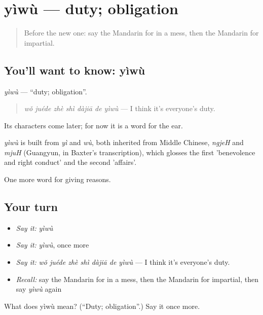 \section[yìwù]{yìwù — duty; obligation}

\label{lesson:ZH-C362-yiwu}



\begin{quote}
Before the new one: say the Mandarin for in a mess, then the Mandarin for impartial.
\end{quote}

\subsection*{You'll want to know: yìwù}
\emph{yìwù} — \textquotedblleft{}duty; obligation\textquotedblright{}.

\begin{quote}
\emph{wǒ juéde zhè shì dàjiā de yìwù} — I think it's everyone's duty.
\end{quote}

Its characters come later; for now it is a word for the ear.

\begin{cousinweb}
\emph{yìwù} is built from \emph{yì} and \emph{wù}, both inherited from Middle Chinese, \emph{ngjeH} and \emph{mjuH} (Guangyun, in Baxter's transcription), which glosses the first 'benevolence and right conduct' and the second 'affairs'.
\end{cousinweb}

\begin{grammarlens}[title={What you've built}]
One more word for giving reasons.
\end{grammarlens}

\subsection*{Your turn}
\begin{itemize}
\raggedright
  \item \emph{Say it:} \emph{yìwù}
  \item \emph{Say it:} \emph{yìwù}, once more
  \item \emph{Say it:} \emph{wǒ juéde zhè shì dàjiā de yìwù} — I think it's everyone's duty.
  \item \emph{Recall:} say the Mandarin for in a mess, then the Mandarin for impartial, then say \emph{yìwù} again
\end{itemize}

\begin{tcolorbox}[breakable,colback=teal!4,colframe=teal!35!black,title={Before you move on}]
What does yìwù mean? (\textquotedblleft{}Duty; obligation\textquotedblright{}.) Say it once more.
\end{tcolorbox}
